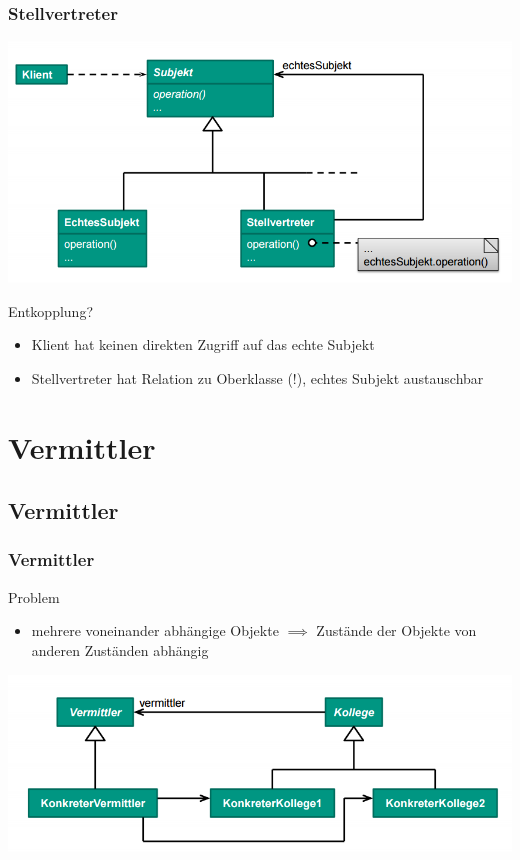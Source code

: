 \documentclass[18pt]{beamer}
\begin{document}
	\begin{frame}
		\frametitle{Stellvertreter}
		\centering
		\includegraphics[scale=0.4]{./pics/tut3/prox.png}
		\begin{block}{Entkopplung?}
			\begin{itemize}
				\pause 
				\item Klient hat keinen direkten Zugriff auf das echte Subjekt
				\pause 
				\item Stellvertreter hat Relation zu Oberklasse (!), echtes Subjekt austauschbar
			\end{itemize}
		\end{block}
	\end{frame}

\section{Vermittler}
	\subsection{Vermittler}
		\begin{frame}
		\frametitle{Vermittler}
		\begin{block}{Problem}
			\begin{itemize}
				\item mehrere voneinander abhängige Objekte \linebreak \pause $\implies$ Zustände der Objekte von anderen Zuständen abhängig
			\end{itemize}
		\end{block}
		\pause
		\centering
		\includegraphics[scale=0.45]{./pics/tut3/med.png}
	\end{frame}
\end{document}
